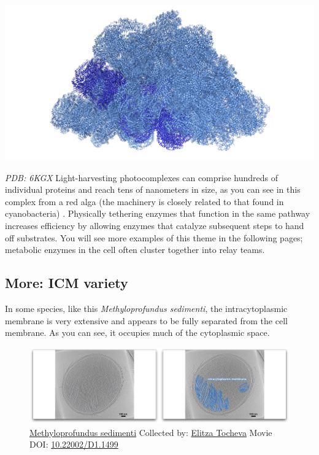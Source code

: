 \documentclass[]{tufte-book}
\begin{document}
\includegraphics{img/schematics/4_3_1}

\emph{PDB: 6KGX} Light-harvesting photocomplexes can comprise hundreds
of individual proteins and reach tens of nanometers in size, as you can
see in this complex from a red alga (the machinery is closely related to
that found in cyanobacteria) \citep{ma2020}. Physically tethering
enzymes that function in the same pathway increases efficiency by
allowing enzymes that catalyze subsequent steps to hand off substrates.
You will see more examples of this theme in the following pages;
metabolic enzymes in the cell often cluster together into relay teams.

\hypertarget{ICM_variety}{\subsection*{More: ICM
variety}\label{ICM_variety}}

In some species, like this \emph{Methyloprofundus sedimenti}, the
intracytoplasmic membrane is very extensive and appears to be fully
separated from the cell membrane. As you can see, it occupies much of
the cytoplasmic space.





\begin{figure}
\includegraphics{movie_stills/4_3a} \caption[\protect\hyperlink{tree}{Methyloprofundus sedimenti}
Collected by: \protect\hyperlink{elitza_tocheva}{Elitza Tocheva} Movie
DOI: \href{https://doi.org/10.22002/D1.1499}{10.22002/D1.1499}]{\protect\hyperlink{tree}{Methyloprofundus sedimenti}
Collected by: \protect\hyperlink{elitza_tocheva}{Elitza Tocheva} Movie
DOI: \href{https://doi.org/10.22002/D1.1499}{10.22002/D1.1499}}\label{fig:4-3a}
\end{figure}
\end{document}
